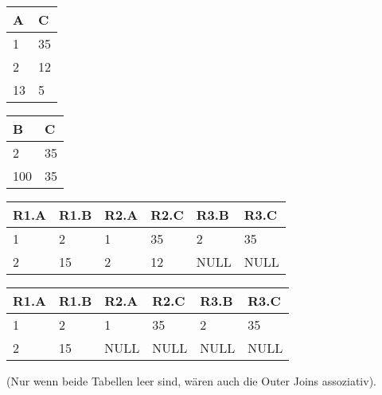 \documentclass{lehramt-informatik-aufgabe}
\begin{document}
\begin{enumerate}
\begin{liAntwort}

\begin{tabular}{|l|l|}
\hline
A  & C  \\ \hline
1  & 35 \\ \hline
2  & 12 \\ \hline
13 & 5  \\ \hline
\end{tabular}


\begin{tabular}{|l|l|}
\hline
B   & C  \\ \hline
2   & 35 \\ \hline
100 & 35 \\ \hline
\end{tabular}


\begin{tabular}{|l|l|l|l|l|l|}
\hline
R1.A & R1.B & R2.A & R2.C & R3.B & R3.C \\ \hline
1    & 2    & 1    & 35   & 2    & 35   \\ \hline
2    & 15   & 2    & 12   & NULL & NULL \\ \hline
\end{tabular}


\begin{tabular}{|l|l|l|l|l|l|}
\hline
R1.A & R1.B & R2.A & R2.C & R3.B & R3.C \\ \hline
1    & 2    & 1    & 35   & 2    & 35   \\ \hline
2    & 15   & NULL & NULL & NULL & NULL \\ \hline
\end{tabular}

(Nur wenn beide Tabellen leer sind, wären auch die Outer Joins assoziativ).
\end{liAntwort}
\end{enumerate}
\end{document}
